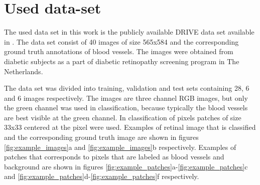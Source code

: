 \documentclass[aps,prb,10pt,twocolumn,groupedaddress]{revtex4-1}
\begin{document}
\section{Used data-set}
\label{sec:used_data_set}
The used data set in this work is the publicly available DRIVE data set \cite{drive} available in \cite{drive_url}. The data set consist of 40 images of size 565x584 and the corresponding ground truth annotations of blood vessels. The images were obtained from diabetic subjects as a part of diabetic retinopathy screening program in The Netherlands.

The data set was divided into training, validation and test sets containing 28, 6 and 6 images respectively. The images are three channel RGB images, but only the green channel was used in classification, because typically the blood vessels are best visible at the green channel. In classification of pixels patches of size 33x33 centered at the pixel were used. Examples of retinal image that is classified and the corresponding ground truth image are shown in figures \ref{fig:example_images}a and \ref{fig:example_images}b respectively. Examples of patches that corresponds to pixels that are labeled as blood vessels and background are shown in figures \ref{fig:example_patches}a-\ref{fig:example_patches}c and \ref{fig:example_patches}d-\ref{fig:example_patches}f respectively.
\end{document}
